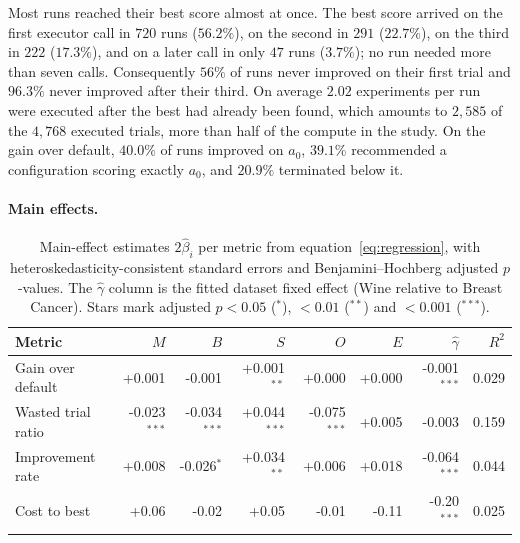 \documentclass[11pt]{article}
\begin{document}
Most runs reached their best score almost at once. The best score arrived on the first executor call in $720$ runs ($56.2\%$), on the second in $291$ ($22.7\%$), on the third in $222$ ($17.3\%$), and on a later call in only $47$ runs ($3.7\%$); no run needed more than seven calls. Consequently $56\%$ of runs never improved on their first trial and $96.3\%$ never improved after their third. On average $2.02$ experiments per run were executed after the best had already been found, which amounts to $2{,}585$ of the $4{,}768$ executed trials, more than half of the compute in the study. On the gain over default, $40.0\%$ of runs improved on $a_0$, $39.1\%$ recommended a configuration scoring exactly $a_0$, and $20.9\%$ terminated below it.

\paragraph{Main effects.}

\begin{table}[t]
\centering
\small
\caption{Main-effect estimates $2\hat\beta_i$ per metric from equation~\eqref{eq:regression}, with heteroskedasticity-consistent standard errors and Benjamini--Hochberg adjusted $p$-values. The $\hat\gamma$ column is the fitted dataset fixed effect (Wine relative to Breast Cancer).
Stars mark adjusted $p<0.05$ ($^{*}$), $<0.01$ ($^{**}$) and $<0.001$ ($^{***}$).}
\label{tab:main}
\begin{tabular}{lrrrrrrr}
\toprule
Metric & $M$ & $B$ & $S$ & $O$ & $E$ & $\hat\gamma$ & $R^2$ \\
\midrule
Gain over default   & +0.001 & -0.001 & +0.001$^{**}$ & +0.000 & +0.000 & -0.001$^{***}$ & 0.029 \\
Wasted trial ratio  & -0.023$^{***}$ & -0.034$^{***}$ & +0.044$^{***}$ & -0.075$^{***}$ & +0.005 & -0.003 & 0.159 \\
Improvement rate    & +0.008 & -0.026$^{*}$ & +0.034$^{**}$ & +0.006 & +0.018 & -0.064$^{***}$ & 0.044 \\
Cost to best        & +0.06 & -0.02 & +0.05 & -0.01 & -0.11 & -0.20$^{***}$ & 0.025 \\
\bottomrule
\end{tabular}
\end{table}
\end{document}
